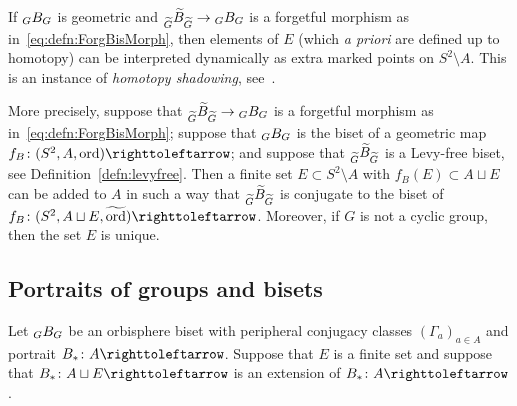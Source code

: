 \documentclass{amsart}
\begin{document}
If $\subscript GB_G$ is geometric and
$\subscript{\widetilde G}{\widetilde B}_{\widetilde G}\to \subscript
G B_G$ is a forgetful morphism as in~\eqref{eq:defn:ForgBisMorph}, then
elements of $E$ (which \emph{a priori} are defined up to homotopy) can
be interpreted dynamically as extra marked points on $S^2\setminus
A$. This is an instance of \emph{homotopy shadowing},
see~\cite{ishii-smillie:shadowing}.

More precisely, suppose that $\subscript{\widetilde G}{\widetilde
B}_{\widetilde G}\to \subscript G B_G$ is a forgetful morphism as
in~\eqref{eq:defn:ForgBisMorph}; suppose that $\subscript GB_G$ is the biset
of a geometric map $f_B\colon (S^2,A,\ord)\selfmap$; and suppose that
$\subscript{\widetilde G}{\widetilde B}_{\widetilde G}$ is a Levy-free biset,
see Definition~\ref{defn:levyfree}.  Then a finite set $E\subset
S^2\setminus A$ with $f_B(E)\subset A\sqcup E$ can be added to $A$ in
such a way that $\subscript{\widetilde G}{\widetilde B}_{\widetilde G}$ is
conjugate to the biset of $f_B\colon (S^2,A\sqcup E,\widetilde
\ord)\selfmap$. Moreover, if $G$ is not a cyclic group, then the set
$E$ is unique.
 
\subsection{Portraits of groups and bisets}\label{ss:portraits}
Let $\subscript GB_G$ be an orbisphere biset with peripheral conjugacy classes
$(\Gamma_a)_{a\in A}$ and portrait $B_*\colon A\selfmap$.
Suppose that $E$ is a finite set and suppose that
$B_*\colon A\sqcup E\selfmap$ is an extension of
$B_*\colon A\selfmap$.
\end{document}
